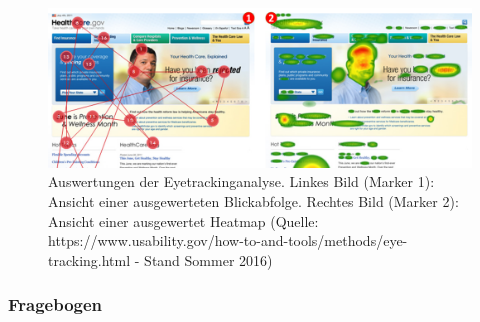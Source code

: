 \documentclass[Bachelorarbeit.tex]{subfiles}
\begin{document}
 

\begin{figure}[H]
\centering
\includegraphics[width=1\linewidth]{img/Evaluation/Eyetracking}
\caption[Auswertungen der Eyetrackinganalyse]{Auswertungen der Eyetrackinganalyse. Linkes Bild (Marker 1): Ansicht einer ausgewerteten Blickabfolge. Rechtes Bild (Marker 2): Ansicht einer ausgewertet Heatmap (Quelle: https://www.usability.gov/how-to-and-tools/methods/eye-tracking.html - Stand Sommer 2016)}
\label{fig:Eyetracking}
\end{figure}


\subsubsection{Fragebogen}
\label{FragebogenEvaluation}
\end{document}
